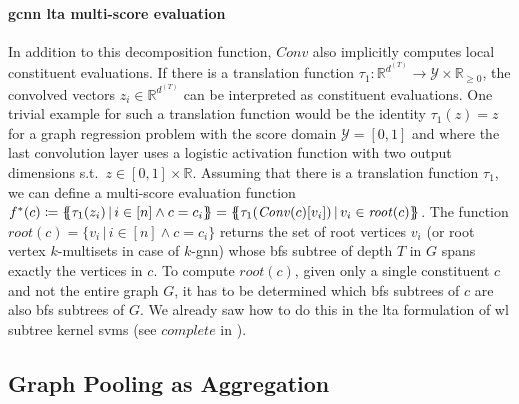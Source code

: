 \paragraph{\ac{gcnn} \ac{lta} multi-score evaluation}
In addition to this decomposition function, $\mathit{Conv}$ also implicitly computes local constituent evaluations.
If there is a translation function $\tau_{1}: \mathbb{R}^{d^{(T)}} \to \mathcal{Y} \times \mathbb{R}_{\geq 0}$, the convolved vectors $z_i \in \mathbb{R}^{d^{(T)}}$ can be interpreted as constituent evaluations.
One trivial example for such a translation function would be the identity $\tau_{1}(z) = z$ for a graph regression problem with the score domain $\mathcal{Y} = [0, 1]$ and where the last convolution layer uses a logistic activation function with two output dimensions s.t.\ $z \in {[0,1]} \times \mathbb{R}$.
Assuming that there is a translation function $\tau_{1}$, we can define a multi-score evaluation function $f^{*}(c) \coloneqq {\ldblbrace \tau_{1}(z_i)\, |\, {i \in [n]} \land {c = c_i} \rdblbrace} = {\ldblbrace \tau_{1}(\mathit{Conv}(c)[v_i])\, |\, v_i \in \mathit{root}(c) \rdblbrace}$.
The function $\mathit{root}(c) = \{ v_i\, |\, {i \in [n]} \land {c = c_i} \}$ returns the set of root vertices $v_i$ (or root vertex $k$-multisets in case of $k$-\acs{gnn}) whose \ac{bfs} subtree of depth $T$ in $G$ spans exactly the vertices in $c$.
To compute $\mathit{root}(c)$, given only a single constituent $c$ and not the entire graph $G$, it has to be determined which \ac{bfs} subtrees of $c$ are also \ac{bfs} subtrees of $G$.
We already saw how to do this in the \ac{lta} formulation of \ac{wl} subtree kernel \acp{svm} (see $\mathit{complete}$ in ).

\subsection{Graph Pooling as Aggregation}%
\label{sec:ltag:formulation:gcnn:pool}

